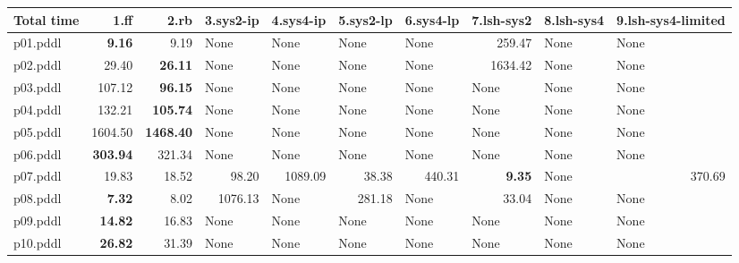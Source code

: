 \documentclass{article}
\begin{document}
\begin{tabular}{@{}lrrrrrrrrr@{}}
Total time & 1.ff & 2.rb & 3.sys2-ip & 4.sys4-ip & 5.sys2-lp & 6.sys4-lp & 7.lsh-sys2 & 8.lsh-sys4 & 9.lsh-sys4-limited \\
\midrule
p01.pddl & \textbf{9.16} & 9.19 & \multicolumn{1}{|l|}{None} & \multicolumn{1}{|l|}{None} & \multicolumn{1}{|l|}{None} & \multicolumn{1}{|l|}{None} & 259.47 & \multicolumn{1}{|l|}{None} & \multicolumn{1}{|l|}{None} \\
p02.pddl & 29.40 & \textbf{26.11} & \multicolumn{1}{|l|}{None} & \multicolumn{1}{|l|}{None} & \multicolumn{1}{|l|}{None} & \multicolumn{1}{|l|}{None} & 1634.42 & \multicolumn{1}{|l|}{None} & \multicolumn{1}{|l|}{None} \\
p03.pddl & 107.12 & \textbf{96.15} & \multicolumn{1}{|l|}{None} & \multicolumn{1}{|l|}{None} & \multicolumn{1}{|l|}{None} & \multicolumn{1}{|l|}{None} & \multicolumn{1}{|l|}{None} & \multicolumn{1}{|l|}{None} & \multicolumn{1}{|l|}{None} \\
p04.pddl & 132.21 & \textbf{105.74} & \multicolumn{1}{|l|}{None} & \multicolumn{1}{|l|}{None} & \multicolumn{1}{|l|}{None} & \multicolumn{1}{|l|}{None} & \multicolumn{1}{|l|}{None} & \multicolumn{1}{|l|}{None} & \multicolumn{1}{|l|}{None} \\
p05.pddl & 1604.50 & \textbf{1468.40} & \multicolumn{1}{|l|}{None} & \multicolumn{1}{|l|}{None} & \multicolumn{1}{|l|}{None} & \multicolumn{1}{|l|}{None} & \multicolumn{1}{|l|}{None} & \multicolumn{1}{|l|}{None} & \multicolumn{1}{|l|}{None} \\
p06.pddl & \textbf{303.94} & 321.34 & \multicolumn{1}{|l|}{None} & \multicolumn{1}{|l|}{None} & \multicolumn{1}{|l|}{None} & \multicolumn{1}{|l|}{None} & \multicolumn{1}{|l|}{None} & \multicolumn{1}{|l|}{None} & \multicolumn{1}{|l|}{None} \\
p07.pddl & 19.83 & 18.52 & 98.20 & 1089.09 & 38.38 & 440.31 & \textbf{9.35} & \multicolumn{1}{|l|}{None} & 370.69 \\
p08.pddl & \textbf{7.32} & 8.02 & 1076.13 & \multicolumn{1}{|l|}{None} & 281.18 & \multicolumn{1}{|l|}{None} & 33.04 & \multicolumn{1}{|l|}{None} & \multicolumn{1}{|l|}{None} \\
p09.pddl & \textbf{14.82} & 16.83 & \multicolumn{1}{|l|}{None} & \multicolumn{1}{|l|}{None} & \multicolumn{1}{|l|}{None} & \multicolumn{1}{|l|}{None} & \multicolumn{1}{|l|}{None} & \multicolumn{1}{|l|}{None} & \multicolumn{1}{|l|}{None} \\
p10.pddl & \textbf{26.82} & 31.39 & \multicolumn{1}{|l|}{None} & \multicolumn{1}{|l|}{None} & \multicolumn{1}{|l|}{None} & \multicolumn{1}{|l|}{None} & \multicolumn{1}{|l|}{None} & \multicolumn{1}{|l|}{None} & \multicolumn{1}{|l|}{None} \\

\end{tabular}
\end{document}
